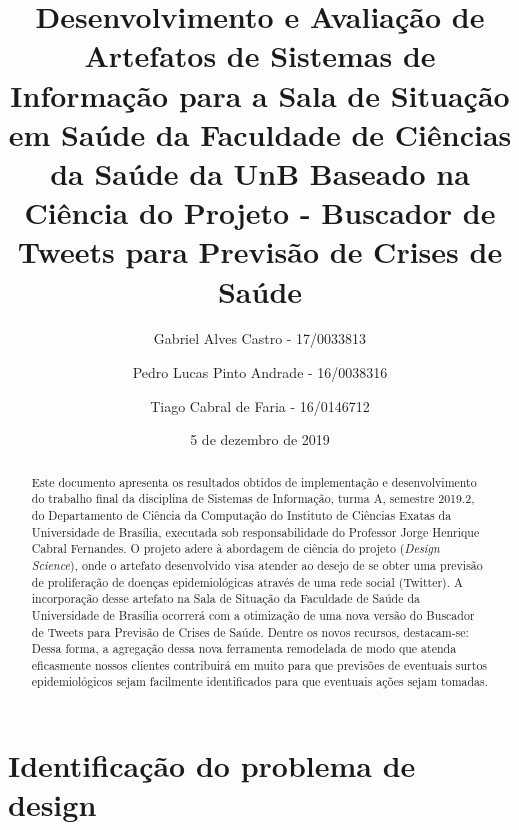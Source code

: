 \documentclass[12pt]{article}
\newcommand{\rascbegin}{\color{red}}    %
\newcommand{\rascend}{\color{black}}    %
\begin{document}
	
	\title{Desenvolvimento e Avaliação de Artefatos de Sistemas de Informação para a Sala de Situação em Saúde da Faculdade de Ciências da Saúde da UnB Baseado na Ciência do Projeto - Buscador de Tweets para Previsão de Crises de Saúde}
	
	
	
	\author{Gabriel Alves Castro - 17/0033813 \and Pedro Lucas Pinto Andrade - 16/0038316 \and Tiago Cabral de Faria - 16/0146712}
	
	\date{5 de dezembro de 2019}
	
	\maketitle
	\tableofcontents
	\listoffigures
	\listoftables
	\printnoidxglossary
	
	
	
	
	\begin{abstract}
		Este documento apresenta os resultados obtidos de implementação e desenvolvimento do trabalho final da disciplina de Sistemas de Informação, turma A, semestre 2019.2, do Departamento de Ciência da Computação do Instituto de Ciências Exatas da Universidade de Brasília, executada sob responsabilidade do Professor Jorge Henrique Cabral Fernandes.
		O projeto adere à abordagem de ciência do projeto (\textit{Design Science}), onde o artefato desenvolvido visa atender ao desejo de se obter uma previsão de proliferação de doenças epidemiológicas através de uma rede social (Twitter).
		A incorporação desse artefato na Sala de Situação da Faculdade de Saúde da Universidade de Brasília ocorrerá com a otimização de uma nova versão do Buscador de Tweets para Previsão de Crises de Saúde. \rascbegin Dentre os novos recursos, destacam-se: \rascend
		Dessa forma, a agregação dessa nova ferramenta remodelada de modo que atenda eficasmente nossos clientes contribuirá em muito para que previsões de eventuais surtos epidemiológicos sejam facilmente identificados para que eventuais ações sejam tomadas.
	\end{abstract}	
	
	
	\section{Identificação do problema de design\label{Sec:CP:IdentifProblema}}
	
\end{document}
